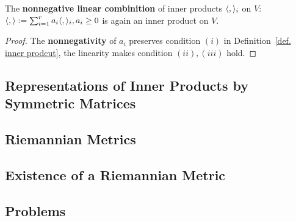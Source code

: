 \begin{proposition}
    The \textbf{nonnegative linear combinition} of inner products $\langle ,  \rangle_i$
     on $V$: $\langle ,  \rangle:=\sum_{i=1}^{r}a_i\langle ,  \rangle_i, a_i \geq 0$ is again an inner product on $V$.
\end{proposition}
\begin{proof}
    The \textbf{nonnegativity} of $a_i$ preserves condition $(i)$ 
    in Definition~\ref{def. inner prodcut}, the linearity makes condition $(ii),(iii)$ hold.
\end{proof}

\subsection{Representations of Inner Products by Symmetric Matrices}

\subsection{Riemannian Metrics}

\subsection{Existence of a Riemannian Metric}

\subsection{Problems}